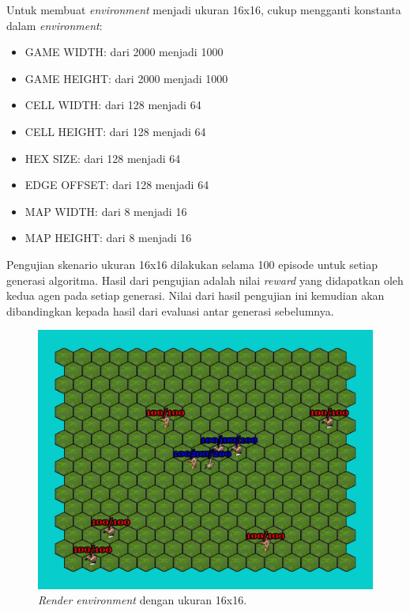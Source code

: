 Untuk membuat \emph{environment} menjadi ukuran 16x16, cukup mengganti konstanta dalam \emph{environment}:

\begin{itemize}
  \item GAME WIDTH: dari 2000 menjadi 1000
  \item GAME HEIGHT: dari 2000 menjadi 1000
  \item CELL WIDTH: dari 128 menjadi 64
  \item CELL HEIGHT: dari 128 menjadi 64
  \item HEX SIZE: dari 128 menjadi 64
  \item EDGE OFFSET: dari 128 menjadi 64
  \item MAP WIDTH: dari 8 menjadi 16
  \item MAP HEIGHT: dari 8 menjadi 16
\end{itemize}

Pengujian skenario ukuran 16x16 dilakukan selama 100 episode untuk setiap generasi algoritma.
Hasil dari pengujian adalah nilai \emph{reward} yang didapatkan oleh kedua agen pada setiap generasi.
Nilai dari hasil pengujian ini kemudian akan dibandingkan kepada hasil dari evaluasi antar generasi sebelumnya.

\begin{figure}[H]
  \centering
    \includegraphics[scale=0.51]{gambar/16x16_env.jpg}
    \caption{\emph{Render environment} dengan ukuran 16x16.}
    \label{fig:16x16Environment}
\end{figure}